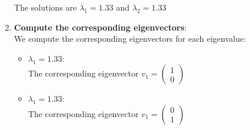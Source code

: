 \documentclass[12pt]{article}
\begin{document}
\begin{enumerate}
    The solutions are $\lambda_1 = 1.33$ and $\lambda_2=1.33$
    
    \item \textbf{Compute the corresponding eigenvectors}:\\
    
    We compute the corresponding eigenvectors for each eigenvalue:
    \begin{itemize}
        \item \textbf{$\lambda_1=1.33$}:\\
        
        The corresponding eigenvector $v_1=\begin{pmatrix}1 \\ 0\end{pmatrix}$
        \item \textbf{$\lambda_1=1.33$}:\\
        
        The corresponding eigenvector $v_1=\begin{pmatrix}0 \\ 1\end{pmatrix}$
    \end{itemize}
    
    
\end{enumerate}
\end{document}
